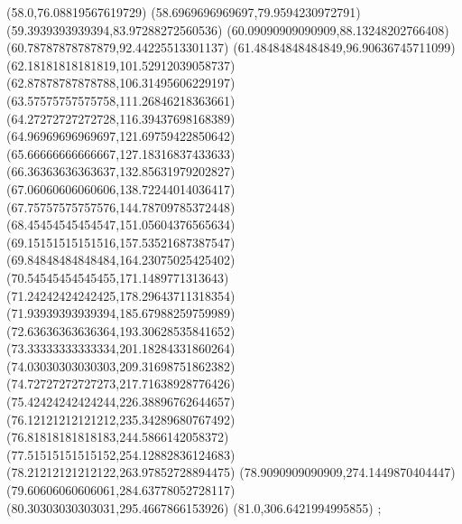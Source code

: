 {(58.0,76.08819567619729)
(58.6969696969697,79.9594230972791)
(59.3939393939394,83.97288272560536)
(60.09090909090909,88.13248202766408)
(60.78787878787879,92.44225513301137)
(61.48484848484849,96.90636745711099)
(62.18181818181819,101.52912039058737)
(62.87878787878788,106.31495606229197)
(63.57575757575758,111.26846218363661)
(64.27272727272728,116.39437698168389)
(64.96969696969697,121.69759422850642)
(65.66666666666667,127.18316837433633)
(66.36363636363637,132.85631979202827)
(67.06060606060606,138.72244014036417)
(67.75757575757576,144.78709785372448)
(68.45454545454547,151.05604376565634)
(69.15151515151516,157.53521687387547)
(69.84848484848484,164.23075025425402)
(70.54545454545455,171.1489771313643)
(71.24242424242425,178.29643711318354)
(71.93939393939394,185.67988259759989)
(72.63636363636364,193.30628535841652)
(73.33333333333334,201.18284331860264)
(74.03030303030303,209.31698751862382)
(74.72727272727273,217.71638928776426)
(75.42424242424244,226.38896762644657)
(76.12121212121212,235.34289680767492)
(76.81818181818183,244.5866142058372)
(77.51515151515152,254.12882836124683)
(78.21212121212122,263.97852728894475)
(78.9090909090909,274.1449870404447)
(79.60606060606061,284.63778052728117)
(80.30303030303031,295.4667866153926)
(81.0,306.6421994995855)
};

